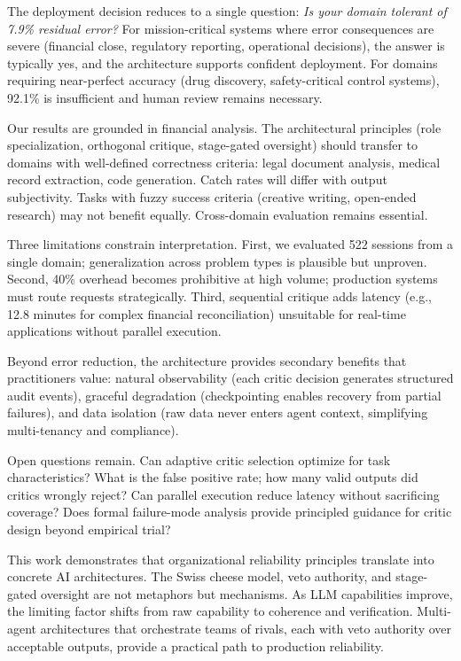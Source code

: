 \documentclass[sigconf]{acmart}
\begin{document}
The deployment decision reduces to a single question: \textit{Is your domain tolerant of 7.9\% residual error?} For mission-critical systems where error consequences are severe (financial close, regulatory reporting, operational decisions), the answer is typically yes, and the architecture supports confident deployment. For domains requiring near-perfect accuracy (drug discovery, safety-critical control systems), 92.1\% is insufficient and human review remains necessary.

Our results are grounded in financial analysis. The architectural principles (role specialization, orthogonal critique, stage-gated oversight) should transfer to domains with well-defined correctness criteria: legal document analysis, medical record extraction, code generation. Catch rates will differ with output subjectivity. Tasks with fuzzy success criteria (creative writing, open-ended research) may not benefit equally. Cross-domain evaluation remains essential.

Three limitations constrain interpretation. First, we evaluated 522 sessions from a single domain; generalization across problem types is plausible but unproven. Second, 40\% overhead becomes prohibitive at high volume; production systems must route requests strategically. Third, sequential critique adds latency (e.g., 12.8 minutes for complex financial reconciliation) unsuitable for real-time applications without parallel execution.

Beyond error reduction, the architecture provides secondary benefits that practitioners value: natural observability (each critic decision generates structured audit events), graceful degradation (checkpointing enables recovery from partial failures), and data isolation (raw data never enters agent context, simplifying multi-tenancy and compliance).

Open questions remain. Can adaptive critic selection optimize for task characteristics? What is the false positive rate; how many valid outputs did critics wrongly reject? Can parallel execution reduce latency without sacrificing coverage? Does formal failure-mode analysis provide principled guidance for critic design beyond empirical trial?

This work demonstrates that organizational reliability principles translate into concrete AI architectures. The Swiss cheese model, veto authority, and stage-gated oversight are not metaphors but mechanisms. As LLM capabilities improve, the limiting factor shifts from raw capability to coherence and verification. Multi-agent architectures that orchestrate teams of rivals, each with veto authority over acceptable outputs, provide a practical path to production reliability.
\end{document}
